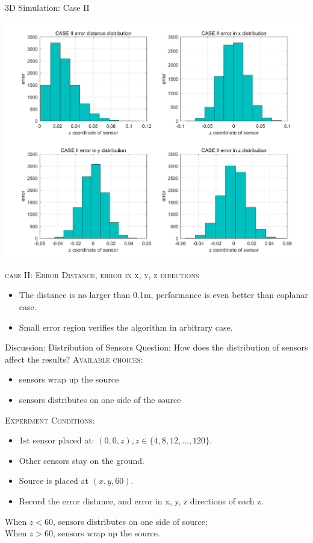 \documentclass[10pt]{beamer}
\begin{document}
\begin{frame}{3D Simulation: Case II}
  \begin{center}
  \includegraphics[scale = 0.15]{img/case2error.png}
  \end{center}
  \begin{center} \textsc{case II: Error Distance, error in x, y, z directions} \end{center}
  \begin{itemize}
    \item \small The distance is no larger than 0.1m, performance is even better than coplanar case.
    \item \small Small error region verifies the algorithm in arbitrary case.
  \end{itemize}
\end{frame}

\begin{frame}{Discussion: Distribution of Sensors}
Question: How does the distribution of sensors affect the results? 
\vfill
\textsc{Available choices}: 
\begin{itemize}
\item \alert{sensors wrap up the source}
\item \alert{sensors distributes on one side of the source}
\end{itemize}
\vfill
\textsc{Experiment Conditions}:
\begin{itemize}
\item 1st sensor placed at: $(0,0,z), z\in\{4, 8, 12, \ldots, 120\}$.
\item Other sensors stay on the ground.
\item Source is placed at $(x,y,60)$.
\item Record the error distance, and error in x, y, z directions of each z.  
\end{itemize}
When $z < 60$, sensors distributes on one side of source;\\
When $z > 60$, sensors wrap up the source. 
\end{frame}
\end{document}
